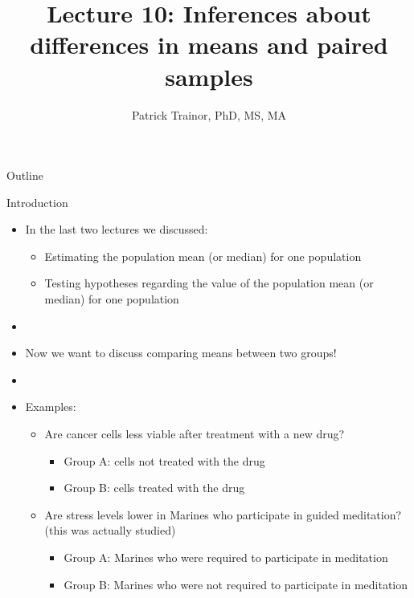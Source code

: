 \documentclass[xcolor=dvipsnames]{beamer}
\title[Lecture 10]{Lecture 10: Inferences about differences in means and paired samples}
\author[Patrick Trainor]{Patrick Trainor, PhD, MS, MA}
\institute[NMSU]{New Mexico State University}
\date{}
\begin{document}
\begin{frame}
\maketitle
\end{frame}

\begin{frame}{Outline}
\tableofcontents[hideallsubsections]
\end{frame}

\begin{frame}{Introduction}
	\begin{itemize}
		\item In the last two lectures we discussed: \pause
		\begin{itemize}
			\item Estimating the population mean (or median) for one population \pause
			\item Testing hypotheses regarding the value of the population mean (or median) for one population \pause
		\end{itemize}
	\item[]
	\item Now we want to discuss comparing means between two groups! \pause
	\item[]
	\item Examples: \pause
	\begin{itemize}
		\item Are cancer cells less viable after treatment with a new drug?  \pause
			\begin{itemize}
				\item Group A: cells not treated with the drug
				\item Group B: cells treated with the drug \pause
			\end{itemize}
		\item Are stress levels lower in Marines who participate in guided meditation? (this was actually studied) \pause
			\begin{itemize}
				\item Group A: Marines who were required to participate in meditation
				\item Group B: Marines who were not required to participate in meditation
			\end{itemize}
	\end{itemize}
	\end{itemize}
\end{frame}
\end{document}
